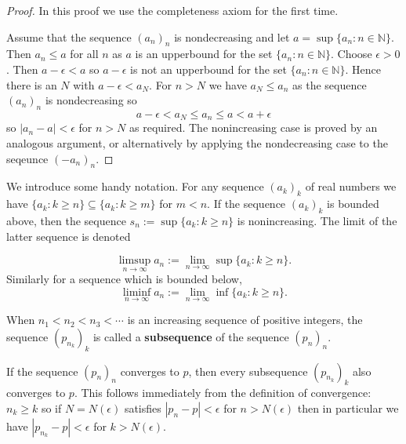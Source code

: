 \documentclass[10pt,a4paper,UTF8]{article}
\begin{document}
\begin{proof}
In this proof we use the completeness axiom for the first time.

Assume that the sequence \((a_n)_n\) is nondecreasing and let \(a=\sup\{a_n:n\in\mathbb{N}\}\).
Then \(a_n\le a\) for all \(n\) as \(a\) is an upperbound for the set \(\{a_n:n\in\mathbb{N}\}\).
Choose \(\epsilon > 0\). Then \(a-\epsilon < a\) so \(a-\epsilon\) is not an upperbound for the set  \(\{a_n:n\in\mathbb{N}\}\).
Hence there is an \(N\) with \(a-\epsilon < a_N\). For \(n > N\) we have \(a_N\le a_n\) as the sequence \((a_n)_n\)
is nondecreasing so
\begin{equation*}
    a-\epsilon < a_N\le a_n\le a < a+\epsilon
\end{equation*}
so \(|a_n-a| < \epsilon\) for \(n > N\) as required.  The nonincreasing case is proved by an analogous argument, or alternatively
by applying the  nondecreasing case to the seqeunce \((-a_n)_n\).
\end{proof}

 We introduce some handy notation.
For any sequence \((a_k)_k\) of real numbers we have
\(\{a_k:k\ge n\}\subseteq\{a_k:k\ge m\}\) for \(m < n\).
If the sequence \((a_k)_k\) is bounded above,
then the sequence
\(s_n:=\sup\{a_k:k\ge n\}\) is nonincreasing.
The limit of the latter sequence is denoted

\begin{equation*}
    \limsup_{n\to\infty}a_n:=\lim_{n\to\infty}\sup\{a_k:k\ge n\}.
\end{equation*}
Similarly for a sequence which is bounded below,
\begin{equation*}
    \liminf_{n\to\infty}a_n:=\lim_{n\to\infty}\inf\{a_k:k\ge n\}.
\end{equation*}


\begin{definition}
 When \(n_1 < n_2 < n_3 < \cdots\) is an increasing
sequence of positive integers, the sequence \((p_{n_k})_k\)
is called a \textbf{subsequence}  of  the sequence \((p_n)_n\).
\end{definition}

\begin{remark}
If the sequence \((p_n)_n\) converges to \(p\), then every subsequence \((p_{n_k})_k\)
also converges to \(p\). This follows immediately from the definition of convergence:
\(n_k\ge k\) so if \(N=N(\epsilon)\) satisfies \(|p_n-p| < \epsilon\) for \(n > N(\epsilon)\) then in particular we have
\(|p_{n_k}-p| < \epsilon\) for \(k > N(\epsilon)\).
\end{remark}
\end{document}
